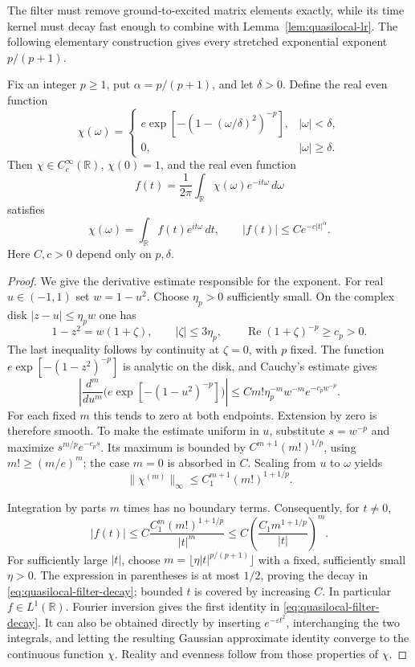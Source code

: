 The filter must remove ground-to-excited matrix elements exactly, while its
time kernel must decay fast enough to combine with
Lemma~\ref{lem:quasilocal-lr}.  The following elementary construction gives
every stretched exponential exponent $p/(p+1)$.

\begin{lemma}
\label{lem:quasilocal-filter}
Fix an integer $p\ge1$, put $\alpha=p/(p+1)$, and let $\delta>0$.
Define the real even function
\[
 \chi(\omega)=
 \begin{cases}
  e\exp[-(1-(\omega/\delta)^2)^{-p}],&|\omega|<\delta,\\
  0,&|\omega|\ge\delta.
 \end{cases}
\]
Then $\chi\in C_c^\infty(\mathbb R)$, $\chi(0)=1$, and the real even
function
\[
 f(t)=\frac1{2\pi}\int_{\mathbb R}\chi(\omega)e^{-it\omega}\,d\omega
\]
satisfies
\begin{equation}
 \chi(\omega)=\int_{\mathbb R}f(t)e^{it\omega}\,dt,
 \qquad |f(t)|\le Ce^{-c|t|^\alpha}.
 \label{eq:quasilocal-filter-decay}
\end{equation}
Here $C,c>0$ depend only on $p,\delta$.
\end{lemma}

\begin{proof}
We give the derivative estimate responsible for the exponent.  For real
$u\in(-1,1)$ set $w=1-u^2$.  Choose $\eta_p>0$ sufficiently small.
On the complex disk $|z-u|\le\eta_pw$ one has
\[
 1-z^2=w(1+\zeta),\qquad |\zeta|\le3\eta_p,
 \qquad \operatorname{Re}(1+\zeta)^{-p}\ge c_p>0.
\]
The last inequality follows by continuity at $\zeta=0$, with $p$ fixed.
The function $e\exp[-(1-z^2)^{-p}]$ is analytic on the disk, and Cauchy's
estimate gives
\[
 \left|\frac{d^m}{du^m}\bigl(e\exp[-(1-u^2)^{-p}]\bigr)\right|
 \le C m!\eta_p^{-m}w^{-m}e^{-c_pw^{-p}}.
\]
For each fixed $m$ this tends to zero at both endpoints.  Extension by zero
is therefore smooth.  To make the estimate uniform in $u$, substitute
$s=w^{-p}$ and maximize $s^{m/p}e^{-c_ps}$.  Its maximum is bounded by
$C^{m+1}(m!)^{1/p}$, using $m!\ge(m/e)^m$; the case $m=0$ is absorbed
in $C$.  Scaling from $u$ to $\omega$ yields
\begin{equation}
 \|\chi^{(m)}\|_\infty\le C_1^{m+1}(m!)^{1+1/p}.
 \label{eq:quasilocal-gevrey}
\end{equation}

Integration by parts $m$ times has no boundary terms.  Consequently, for
$t\ne0$,
\[
 |f(t)|\le C\frac{C_1^m(m!)^{1+1/p}}{|t|^m}
       \le C\left(\frac{C_1m^{1+1/p}}{|t|}\right)^m.
\]
For sufficiently large $|t|$, choose
$m=\lfloor\eta |t|^{p/(p+1)}\rfloor$ with a fixed, sufficiently small
$\eta>0$.  The expression in parentheses is at most $1/2$, proving
the decay in \eqref{eq:quasilocal-filter-decay}; bounded $t$ is covered
by increasing $C$.  In particular $f\in L^1(\mathbb R)$.  Fourier
inversion gives the first identity in \eqref{eq:quasilocal-filter-decay}.
It can also be obtained directly by inserting $e^{-\varepsilon t^2}$,
interchanging the two integrals, and letting the resulting Gaussian
approximate identity converge to the continuous function $\chi$.
Reality and evenness follow from those properties of $\chi$.
\end{proof}

